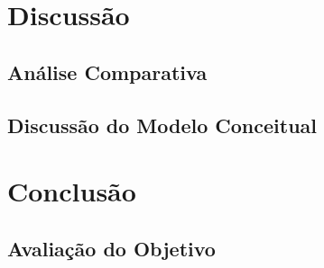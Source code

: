 \documentclass[openright]{normas-utf-tex} %
\begin{document}
\chapter{Discussão}

	

	\section{Análise Comparativa}\label{analisecomparativa}

		\label{analisecomparativa}

		
		
		
		
		
	
		
	
		
	
		
		
		

		

		
		

	\section{Discussão do Modelo Conceitual}\label{constresult}

		



\label{chap:anacomp}

\chapter{Conclusão}
\label{chpa:conc}
	


	\section{Avaliação do Objetivo}

		
\end{document}
